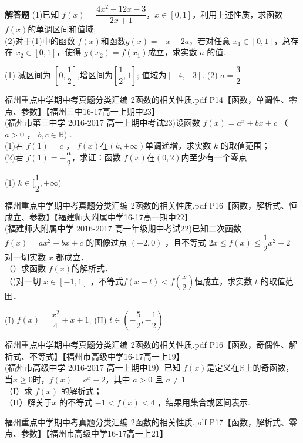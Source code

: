 \begin{exercise}{\bf 解答题}
     (1)已知 $f(x)=\dfrac{4x^2-12x-3}{2x+1} $，$x\in[0,1]$，利用上述性质，求函数 $f(x)$的单调区间和值域;\\
     (2)对于(1)中的函数 $f(x)$和函数$g(x)=-x-2a$，若对任意 $x_1 \in[0,1]$，总存在 $x_2\in[0,1]$，使得 $g(x_2 )=f(x_1 ) $成立，求实数 $a$ 的值.
     \begin{answer}
      (1) 减区间为 $[0,\dfrac12] $,增区间为$[\dfrac12,1] $; 值域为$[-4,-3] $.
      (2) $a=\dfrac32 $
     \end{answer}
    \item 福州重点中学期中考真题分类汇编 2函数的相关性质.pdf P14【函数，单调性、零点、参数】【福州三中16-17高一上期中23】\\
     (福州市第三中学 2016-2017 高一上期中考试23)设函数 $f (x)=a^x+ bx +c$ （ $a> 0$ ， $b, c\in \mathbb{R})$ . \\
     (1)若 $f (1)= c$ ， $f (x)$在$( k,+\infty)$单调递增，求实数 $k$ 的取值范围；\\
     (2)若 $f( 1)=-\dfrac a2$，求证：函数 $f (x) $在$( 0,2) $内至少有一个零点.
      \begin{answer}
       (1) $k\in [\dfrac12,+\infty) $
      \end{answer}
    \item 福州重点中学期中考真题分类汇编 2函数的相关性质.pdf P16【函数，解析式、恒成立、参数】【福建师大附属中学16-17高一期中22】\\
     (福建师大附属中学 2016-2017 高一年级期中考试22)已知二次函数 $f ( x )= ax^2+ bx+ c$ 的图像过点 $(-2,0)$ ，且不等式 $2 x\leq f ( x )\leq \dfrac12x^2+ 2$ 对一切实数 $x$ 都成立．\\
     （）求函数 $f ( x ) $的解析式． \\
     （)对一切 $x\in[-1,1] $ ，不等式$f(x+t)<f(\dfrac x2) $恒成立，求实数 $t$ 的取值范围．
     \begin{answer}
       (I) $f(x)=\dfrac{x^2}4+x+1 $; (II) $t\in (-\dfrac52,-\dfrac12) $
     \end{answer}
    \item 福州重点中学期中考真题分类汇编 2函数的相关性质.pdf P16【函数，奇偶性、解析式、不等式】【福州市高级中学16-17高一上19】\\
     (福州市高级中学 2016-2017 高一上期中19）已知 $f(x)$是定义在$\mathbb{R}$上的奇函数，当$x\geq0$时，$f(x)=a^x-2$，其中 $a> 0$ 且 $a\neq 1$\\
     （I）求 $f (x )$ 的解析式；\\
     （II）解关于$x$ 的不等式 $-1< f(x)<4$ ，结果用集合或区间表示.
    \item 福州重点中学期中考真题分类汇编 2函数的相关性质.pdf P17【函数，解析式、零点、参数】【福州市高级中学16-17高一上21】\\

\end{exercise}
